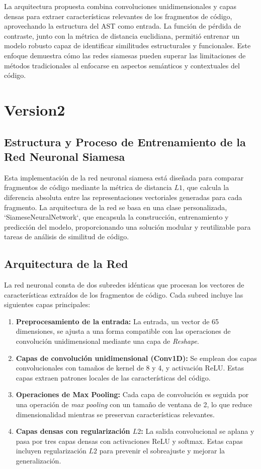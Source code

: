 La arquitectura propuesta combina convoluciones unidimensionales y capas densas para extraer características relevantes de los fragmentos de código, aprovechando la estructura del AST como entrada. La función de pérdida de contraste, junto con la métrica de distancia euclidiana, permitió entrenar un modelo robusto capaz de identificar similitudes estructurales y funcionales. Este enfoque demuestra cómo las redes siamesas pueden superar las limitaciones de métodos tradicionales al enfocarse en aspectos semánticos y contextuales del código.

\section{Version2}

\subsection{Estructura y Proceso de Entrenamiento de la Red Neuronal Siamesa} 

Esta implementación de la red neuronal siamesa está diseñada para comparar fragmentos de código mediante la métrica de distancia \( L1 \), que calcula la diferencia absoluta entre las representaciones vectoriales generadas para cada fragmento. La arquitectura de la red se basa en una clase personalizada, `SiameseNeuralNetwork`, que encapsula la construcción, entrenamiento y predicción del modelo, proporcionando una solución modular y reutilizable para tareas de análisis de similitud de código.

\subsection{Arquitectura de la Red} 

La red neuronal consta de dos subredes idénticas que procesan los vectores de características extraídos de los fragmentos de código. Cada subred incluye las siguientes capas principales:

\begin{enumerate}
    \item \textbf{Preprocesamiento de la entrada:} La entrada, un vector de 65 dimensiones, se ajusta a una forma compatible con las operaciones de convolución unidimensional mediante una capa de \textit{Reshape}.
    \item \textbf{Capas de convolución unidimensional (Conv1D):} Se emplean dos capas convolucionales con tamaños de kernel de 8 y 4, y activación ReLU. Estas capas extraen patrones locales de las características del código.
    \item \textbf{Operaciones de Max Pooling:} Cada capa de convolución es seguida por una operación de \textit{max pooling} con un tamaño de ventana de 2, lo que reduce dimensionalidad mientras se preservan características relevantes.
    \item \textbf{Capas densas con regularización \( L2 \):} La salida convolucional se aplana y pasa por tres capas densas con activaciones ReLU y softmax. Estas capas incluyen regularización \( L2 \) para prevenir el sobreajuste y mejorar la generalización.
\end{enumerate}

